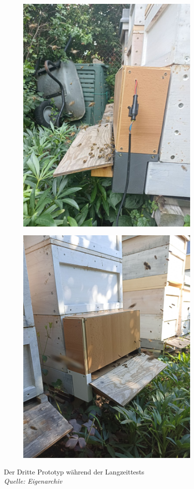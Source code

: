\documentclass[11pt,a4paper]{article}
\begin{document}
\begin{figure}[H] \label{fig:third-generation-on-hive}
    \centering
    \begin{subfigure}{.45\textwidth}
        \includegraphics[width=.8\textwidth]{images/thirdPrototype1.jpg}
    \end{subfigure}
    \hfill
    \begin{subfigure}{.45\textwidth}
        \includegraphics[width=.8\textwidth]{images/thirdPrototype2.jpg}
    \end{subfigure}
    \caption{Der Dritte Prototyp während der Langzeittests \\
    \textit{Quelle: Eigenarchiv}}
\end{figure}
\end{document}
